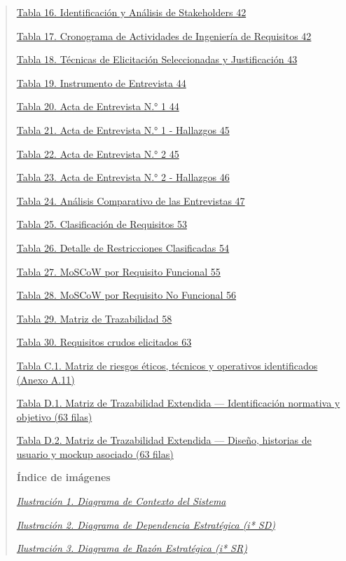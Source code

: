 \documentclass[
]{article}
\begin{document}
\begin{quote}
\hyperref[_bookmark70]{Tabla 16. Identificación y Análisis de Stakeholders 42}

\hyperref[_bookmark72]{Tabla 17. Cronograma de Actividades de Ingeniería de Requisitos 42}

\hyperref[_bookmark74]{Tabla 18. Técnicas de Elicitación Seleccionadas y Justificación 43}

\hyperref[_bookmark77]{Tabla 19. Instrumento de Entrevista 44}

\hyperref[_bookmark79]{Tabla 20. Acta de Entrevista N.° 1 44}

\hyperref[_bookmark80]{Tabla 21. Acta de Entrevista N.° 1 - Hallazgos 45}

\hyperref[_bookmark81]{Tabla 22. Acta de Entrevista N.° 2 45}

\hyperref[_bookmark82]{Tabla 23. Acta de Entrevista N.° 2 - Hallazgos 46}

\hyperref[_bookmark84]{Tabla 24. Análisis Comparativo de las Entrevistas 47}

\hyperref[_bookmark102]{Tabla 25. Clasificación de Requisitos 53}

\hyperref[_bookmark103]{Tabla 26. Detalle de Restricciones Clasificadas 54}

\hyperref[_bookmark104]{Tabla 27. MoSCoW por Requisito Funcional 55}

\hyperref[_bookmark106]{Tabla 28. MoSCoW por Requisito No Funcional 56}

\hyperref[_bookmark113]{Tabla 29. Matriz de Trazabilidad 58}

\hyperref[_bookmark117]{Tabla 30. Requisitos crudos elicitados 63}

\hyperref[_bookmarkC7]{Tabla C.1. Matriz de riesgos éticos, técnicos y operativos identificados (Anexo A.11)}

\hyperref[_bookmarkD1]{Tabla D.1. Matriz de Trazabilidad Extendida --- Identificación normativa y objetivo (63 filas)}

\hyperref[_bookmarkD2]{Tabla D.2. Matriz de Trazabilidad Extendida --- Diseño, historias de usuario y mockup asociado (63 filas)}

\textbf{Índice de imágenes}

\hyperref[_bookmark13]{\emph{Ilustración 1. Diagrama de Contexto del Sistema}}

\hyperref[_bookmark19b]{\emph{Ilustración 2. Diagrama de Dependencia Estratégica (i* SD)}}

\hyperref[_bookmark19c]{\emph{Ilustración 3. Diagrama de Razón Estratégica (i* SR)}}


\end{quote}
\end{document}
